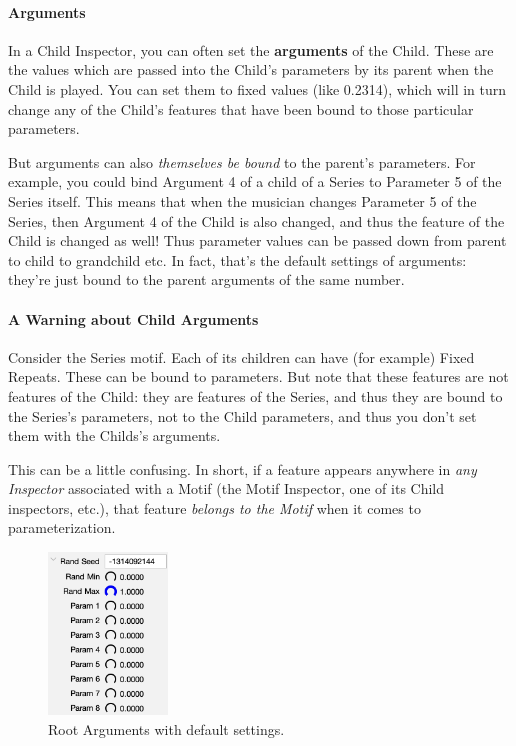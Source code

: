 \documentclass[twoside,10pt]{article}
\begin{document}
\paragraph{Arguments}

In a Child Inspector, you can often set the {\bf arguments} of the Child.  These are the values which are passed into the Child's parameters by its parent when the Child is played.    You can set them to fixed values (like 0.2314), which will in turn change any of the Child's features that have been bound to those particular parameters.

But arguments can also {\it themselves be bound} to the parent's parameters.  For example, you could bind Argument 4 of a child of a Series to Parameter 5 of the Series itself.  This means that when the musician changes Parameter 5 of the Series, then Argument 4 of the Child is also changed, and thus the feature of the Child is changed as well!  Thus parameter values can be passed down from parent to child to grandchild etc.  In fact, that's the default settings of arguments: they're just bound to the parent arguments of the same number.

\paragraph{A Warning about Child Arguments}

Consider the Series motif. Each of its children can have (for example) Fixed Repeats.  These can be bound to parameters.  But note that these features are not features of the Child: they are features of the Series, and thus they are bound to the Series's parameters, not to the Child parameters, and thus you don't set them with the Childs's arguments.

This can be a little confusing.  In short, if a feature appears anywhere in {\it any Inspector} associated with a Motif (the Motif Inspector, one of its Child inspectors, etc.), that feature {\it belongs to the Motif} when it comes to parameterization.  

\begin{figure}
\vspace{-1em}
\includegraphics[width=1.25in]{rootarguments}
\caption{Root Arguments with default settings.}
\label{rootarguments}
\end{figure}
\end{document}
